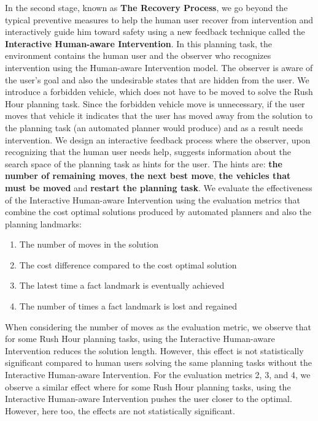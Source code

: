 In the second stage, known as \textbf{The Recovery Process}, we go beyond the typical preventive measures to help the human user recover from intervention and interactively guide him toward safety using a new feedback technique called the \textbf{Interactive Human-aware Intervention}.
In this planning task, the environment contains the human user and the observer who recognizes intervention using the Human-aware Intervention model.
The observer is aware of the user's goal and also the undesirable states that are hidden from the user.
We introduce a forbidden vehicle, which does not have to be moved to solve the Rush Hour planning task.
Since the forbidden vehicle move is unnecessary, if the user moves that vehicle it indicates that the user has moved away from the solution to the planning task (an automated planner would produce) and as a result needs intervention.
We design an interactive feedback process where the observer, upon recognizing that the human user needs help, suggests information about the search space of the planning task as hints for the user.
The hints are: \textbf{the number of remaining moves}, \textbf{the next best move}, \textbf{the vehicles that must be moved} and \textbf{restart the planning task}.
We evaluate the effectiveness of the Interactive Human-aware Intervention using the evaluation metrics that combine the cost optimal solutions produced by automated planners and also the planning landmarks:
\begin{enumerate}
\item The number of moves in the solution
\item The cost difference compared to the cost optimal solution
\item The latest time a fact landmark is eventually achieved
\item The number of times a fact landmark is lost and regained
\end{enumerate}
When considering the number of moves as the evaluation metric, we observe that for some Rush Hour planning tasks, using the Interactive Human-aware Intervention reduces the solution length. 
However, this effect is not statistically significant compared to human users solving the same planning tasks without the Interactive Human-aware Intervention.
For the evaluation metrics 2, 3, and 4, we observe a similar effect where for some Rush Hour planning tasks, using the Interactive Human-aware Intervention pushes the user closer to the optimal.
However, here too, the effects are not statistically significant.


